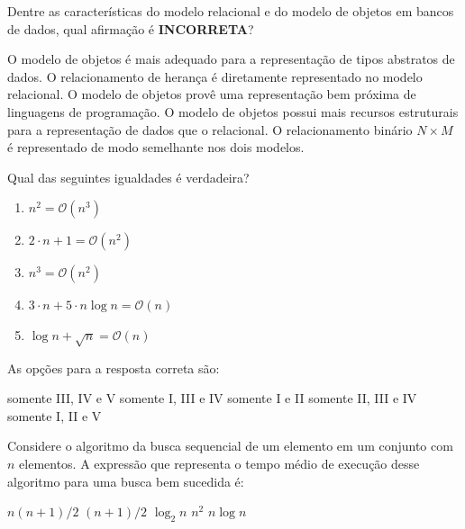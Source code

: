 \documentclass[12pt, addpoints]{exam}
\begin{document}
\begin{questions}
Dentre as características do modelo relacional e do modelo de objetos em bancos de dados, qual afirmação é \textbf{INCORRETA}?


\begin{choices}
\choice O modelo de objetos é mais adequado para a representação de tipos abstratos de dados.
\choice O relacionamento de herança é diretamente representado no modelo relacional.
\choice O modelo de objetos provê uma representação bem próxima de linguagens de programação.
\choice O modelo de objetos possui mais recursos estruturais para a representação de dados que o relacional.
\choice O relacionamento binário \( N \times M \) é representado de modo semelhante nos dois modelos.	
\end{choices}

\question

Qual das seguintes igualdades é verdadeira?



\begin{enumerate}

    \item[(I)] \( n^2 = \mathcal{O}(n^3) \)

    \item[(II)] \( 2 \cdot n + 1 = \mathcal{O}(n^2) \)

    \item[(III)] \( n^3 = \mathcal{O}(n^2) \)

    \item[(IV)] \( 3 \cdot n + 5 \cdot n \log n = \mathcal{O}(n) \)

    \item[(V)] \( \log n + \sqrt{n} = \mathcal{O}(n) \)

\end{enumerate}



As opções para a resposta correta são:
\begin{choices}
\choice somente III, IV e V
\choice somente I, III e IV
\choice somente I e II
\choice somente II, III e IV
\choice somente I, II e V
\end{choices}

\question

Considere o algoritmo da busca sequencial de um elemento em um conjunto com \( n \) elementos. A expressão que representa o tempo médio de execução desse algoritmo para uma busca bem sucedida é:
\begin{choices}
\choice \( n(n + 1)/2 \)
\choice \( (n + 1)/2 \)
\choice \( \log_2 n \)
\choice \( n^2 \)
\choice \( n \log n \)
\end{choices}


\end{questions}
\end{document}
